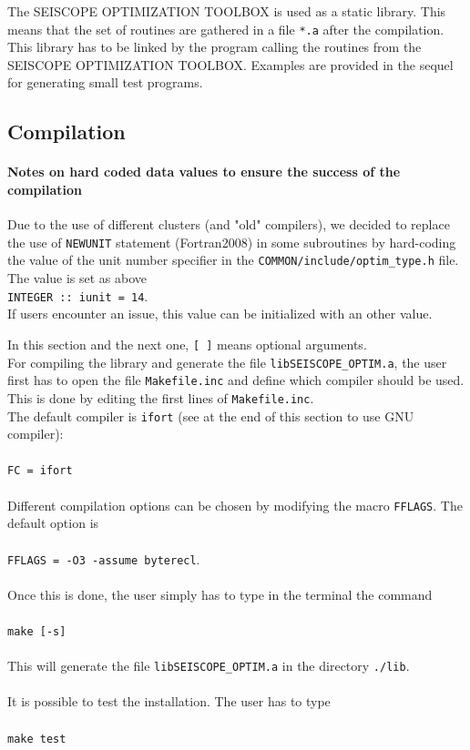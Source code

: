 \documentclass[a4paper,twoside,final,onecolumn,11pt,openright]{article}
\begin{document}
\vspace{0.5cm}

The SEISCOPE OPTIMIZATION TOOLBOX is used as a static library. This means that the set of routines are gathered in a file \texttt{*.a} after the compilation. This library has to be linked by the program calling the routines from the SEISCOPE OPTIMIZATION TOOLBOX. Examples are provided in the sequel for generating small test programs. 

\subsection{Compilation}
\paragraph*{Notes on hard coded data values to ensure the success of the compilation}
Due to the use of different clusters (and "old" compilers), we decided to replace the use of \texttt{NEWUNIT} statement (Fortran2008) in some subroutines by hard-coding the value of the unit number specifier in the \texttt{COMMON/include/optim\_type.h} file.\\
The value is set as above\\
\texttt{INTEGER :: iunit = 14}.\\
If users encounter an issue, this value can be initialized with an other value.

In this section and the next one, \texttt{[ ]}  means optional arguments.\\

For compiling the library and generate the file \texttt{libSEISCOPE\_OPTIM.a}, the user first has to open the file \texttt{Makefile.inc} and define which compiler should be used. This is done by editing the first lines of \texttt{Makefile.inc}. \\
 The default compiler is \texttt{ifort} (see at the end of this section to use GNU compiler):
\\
\\
\texttt{FC    =   ifort}
\\
\\
Different compilation options can be chosen by modifying the macro \texttt{FFLAGS}. The default option is 
\\
\\
\texttt{FFLAGS  =  -O3 -assume byterecl}. 
\\
\\
Once this is done, the user simply has to type in the terminal the command
\\
\\
\texttt{make [-s]}
\\
\\
This will generate the file \texttt{libSEISCOPE\_OPTIM.a} in the directory \texttt{./lib}.
\\
\\
It is possible to test the installation. The user has to type
\\
\\
\texttt{make test}
\end{document}
